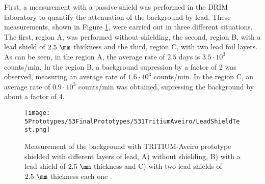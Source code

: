

First, a measurement with a passive shield was performed in the DRIM laboratory to quantify the attenuation of the background by lead. These measurements, shown in Figure \ref{fig:LeadShieldTest}, were carried out in three different situations. The first, region A, was performed without shielding, the second, region B, with a lead shield of $2.5~\mm$ thickness and the third, region C, with two lead foil layers. As can be seen, in the region A, the average rate of $2.5$ days is $3.5 \cdot{} 10^3$ counts/min. In the region B, a background supression by a factor of 2 was observed, measuring an average rate of $1.6 \cdot{} 10^3$ counts/min. In the region C, an average rate of $0.9 \cdot{} 10^3$ counts/min was obtained, supressing the background by about a factor of 4.

\begin{figure}[h]
\centering
\texttt{[image: 5Prototypes/53FinalPrototypes/531TritiumAveiro/LeadShieldTest.png]}
\caption{Measurement of the background with TRITIUM-Aveiro prototype shielded with different layers of lead, A) without shielding, B) with a lead shield of $2.5~\mm$ thickness and C) with two lead shields of $2.5~\mm$ thickness each one \cite{ExperimentalPaperCarlos}.\label{fig:LeadShieldTest}}
\end{figure}

